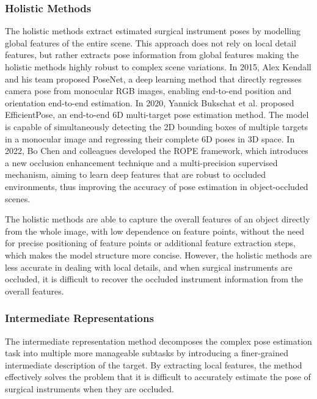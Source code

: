 \documentclass[12pt]{article}
\begin{document}
\subsubsection{Holistic Methods}
The holistic methods extract estimated surgical instrument poses by modelling global features of the entire scene\cite{fan2024reinforcement}. This approach does not rely on local detail features, but rather extracts pose information from global features making the holistic methods highly robust to complex scene variations. In 2015, Alex Kendall and his team proposed PoseNet, a deep learning method that directly regresses camera pose from monocular RGB images, enabling end-to-end position and orientation end-to-end estimation\cite{kendall2015posenet}. In 2020, Yannick Bukschat et al. proposed EfficientPose, an end-to-end 6D multi-target pose estimation method. The model is capable of simultaneously detecting the 2D bounding boxes of multiple targets in a monocular image and regressing their complete 6D poses in 3D space\cite{bukschat2020efficientpose}. In 2022, Bo Chen and colleagues developed the ROPE framework, which introduces a new occlusion enhancement technique and a multi-precision supervised mechanism, aiming to learn deep features that are robust to occluded environments, thus improving the accuracy of pose estimation in object-occluded scenes\cite{chen2022occlusion}.

The holistic methods are able to capture the overall features of an object directly from the whole image, with low dependence on feature points, without the need for precise positioning of feature points or additional feature extraction steps, which makes the model structure more concise\cite{chen2022occlusion}. However, the holistic methods are less accurate in dealing with local details, and when surgical instruments are occluded, it is difficult to recover the occluded instrument information from the overall features\cite{watson2014nature}.

\subsubsection{Intermediate Representations}
The intermediate representation method decomposes the complex pose estimation task into multiple more manageable subtasks by introducing a finer-grained intermediate description of the target. By extracting local features, the method effectively solves the problem that it is difficult to accurately estimate the pose of surgical instruments when they are occluded\cite{song2020hybridpose}.
\end{document}
